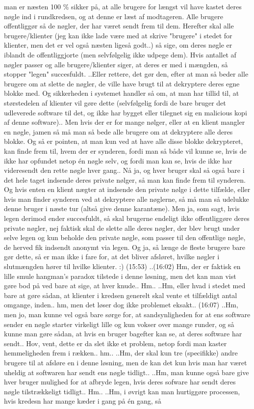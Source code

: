 \documentclass{article}
\begin{document}
man er næsten 100 \% sikker på, at alle brugere for længst vil have kastet deres nøgle ind i rundkredsen, og at denne er læst af modtageren. Alle brugere offentliggør så de nøgler, der har været sendt frem til dem. Herefter skal alle brugere/klienter (jeg kan ikke lade være med at skrive "brugere" i stedet for klienter, men det er vel også næsten ligeså godt..) så sige, om deres nøgle er iblandt de offentliggjorte (men selvfølgelig ikke udpege dem). Hvis antallet af nøgler passer og alle brugere/klienter siger, at deres er med i mængden, så stopper "legen" succesfuldt. ..Eller rettere, det gør den, efter at man så beder alle brugere om at slette de nøgler, de ville have brugt til at dekryptere deres egne blokke med. Og sikkerheden i systemet handler så om, at man har tillid til, at størstedelen af klienter vil gøre dette (selvfølgelig fordi de bare bruger det udleverede software til det, og ikke har bygget eller tilegnet sig en malicious kopi af denne software).. Men hvis der er for mange nølger, eller at en klient mangler en nøgle, jamen så må man så bede alle brugere om at dekryptere alle deres blokke. Og så er pointen, at man kun ved at have alle disse blokke dekrypteret, kan finde frem til, hvem der er synderen, fordi man så både vil kunne se, hvis de ikke har opfundet netop én nøgle selv, og fordi man kan se, hvis de ikke har videresendt den rette nøgle hver gang.. Nå ja, og hver bruger skal så også bare i det hele taget indsende deres private nølger, så man kan finde frem til synderen. Og hvis enten en klient nægter at indsende den private nølge i dette tilfælde, eller hvis man finder synderen ved at dekryptere alle nøglerne, så må man så udelukke denne bruger i næste tur (altså give denne karantæne). Men ja, som sagt, hvis legen derimod ender succesfuldt, så skal brugerne endeligt ikke offentliggøre deres private nøgler, nej faktisk skal de slette alle deres nøgler, der blev brugt under selve legen og kun beholde den private nøgle, som passer til den offentlige nøgle, de herved fik indsendt anonymt via legen. Og ja, så længe de fleste brugere bare gør dette, så er man ikke i fare for, at det bliver afsløret, hvilke nøgler i slutmængden hører til hvilke klienter. :) (15:53) ..(16:02) Hm, der er faktisk en lille smule hangman's paradox tilstede i denne løsning, men det kan man vist gøre bod på ved bare at sige, at hver knude.. Hm.. ..Hm, eller hvad i stedet med bare at gøre sådan, at klienter i kredsen generelt skal vente et tilfældigt antal omgange, inden.. hm, men det løser dog ikke problemet eksakt.. (16:07) ..Hm, men jo, man kunne vel også bare sørge for, at sandsynligheden for at ens software sender en nøgle starter virkeligt lille og kun vokser over mange runder, og så kunne man gøre sådan, at hvis en bruger bagefter kan se, at deres software har sendt.. Hov, vent, dette er da slet ikke et problem, netop fordi man kaster hemmeligheden frem i rækken.. hm.. ..Hm, der skal kun tre (specifikke) andre brugere til at afsløre en i denne løsning, men de kan det kun hvis man har været uheldig at softwaren har sendt ens nøgle tidligt.. ..Hm, man kunne også bare give hver bruger mulighed for at afbryde legen, hvis deres sofware har sendt deres nøgle tilstrækkeligt tidligt.. Hm.. ..Hm, i øvrigt kan man hurtiggøre processen, hvis kredesn har mange kæder i gang på én gang, så 
\end{document}

